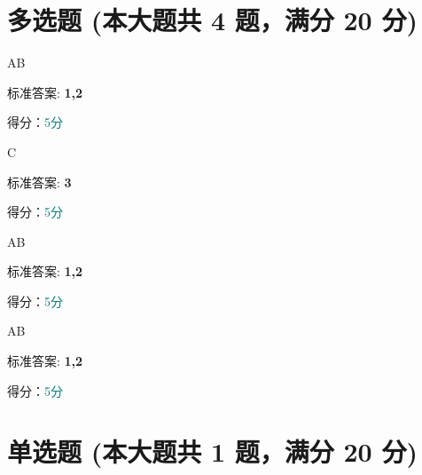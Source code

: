 \documentclass[12pt, a4paper, addpoints, answers]{exam}
\begin{document}
\hspace{5cm}

\section{\normalsize{多选题 (本大题共 4 题，满分 20 分)}}
\hspace{1.5cm}

\begin{questions}
\question[5] AB

\begin{oneparcheckboxes}
\end{oneparcheckboxes}

标准答案: \textbf{1,2}

得分：\textcolor{teal}{5分}

\question[5] C

\begin{oneparcheckboxes}
\end{oneparcheckboxes}

标准答案: \textbf{3}

得分：\textcolor{teal}{5分}

\question[5] AB

\begin{oneparcheckboxes}
\end{oneparcheckboxes}

标准答案: \textbf{1,2}

得分：\textcolor{teal}{5分}

\question[5] AB

\begin{oneparcheckboxes}
\end{oneparcheckboxes}

标准答案: \textbf{1,2}

得分：\textcolor{teal}{5分}

\end{questions}

\hspace{5cm}

\section{\normalsize{单选题 (本大题共 1 题，满分 20 分)}}
\hspace{1.5cm}
\end{document}
